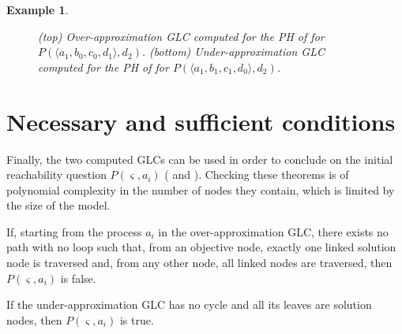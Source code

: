 \documentclass{movep}
\def\pref{\prettyref}
\newtheorem*{example*}{Example}{\itshape}{}
\newcommand{\PHfrappeB}{\Rsh}
\newcommand{\PHobjectif}[2]{\mbox{$#1\PHfrappeB^*\!#2$}}
\newcommand{\PHobj}{\PHobjectif}
\def\ctx{\varsigma}
\newcommand{\Pcai}{P(\ctx, a_i)}
\newcommand{\PHetat}[1]{\mbox{$\langle #1 \rangle$}}
\def\ctx{\varsigma}
\newcounter{la}
\begin{document}
\begin{example*}
\begin{figure}[ht]

\caption{\label{fig:glc}
(top) Over-approximation GLC computed for the PH of \pref{fig:ph}
for $P(\PHetat{a_1,b_0,c_0,d_1}, d_2)$.
(bottom) Under-approximation GLC computed for the PH of \pref{fig:ph}
for $P(\PHetat{a_1,b_1,c_1,d_0}, d_2)$.
}
\end{figure}
\end{example*}



\section{Necessary and sufficient conditions}
\label{sec:th}

Finally, the two computed GLCs can be used in order to conclude on the initial reachability question
$\Pcai$ (\pref{th:oa} and \pref{th:ua}).
Checking these theorems is of polynomial complexity in the number of nodes they contain,
which is limited by the size of the model.

\begin{theorem}
\label{th:oa}
  If, starting from the process $a_i$ in the over-approximation GLC,
  there exists no path with no loop such that,
  from an objective node, exactly one linked solution node is traversed
  and, from any other node, all linked nodes are traversed,
  then $\Pcai$ is false.
\end{theorem}

\begin{theorem}
\label{th:ua}
  If the under-approximation GLC has no cycle and all its leaves are solution nodes,
  then $\Pcai$ is true.
\end{theorem}
\end{document}
